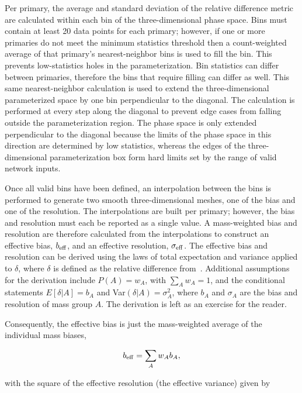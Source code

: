 Per primary, the average and standard deviation of the relative difference metric are calculated within each bin of the three-dimensional phase space.
Bins must contain at least 20 data points for each primary; however, if one or more primaries do not meet the minimum statistics threshold then a count-weighted average of that primary's nearest-neighbor bins is used to fill the bin.
This prevents low-statistics holes in the parameterization.
Bin statistics can differ between primaries, therefore the bins that require filling can differ as well.
This same nearest-neighbor calculation is used to extend the three-dimensional parameterized space by one bin perpendicular to the diagonal.
The calculation is performed at every step along the diagonal to prevent edge cases from falling outside the parameterization region.
The phase space is only extended perpendicular to the diagonal because the limits of the phase space in this direction are determined by low statistics, whereas the edges of the three-dimensional parameterization box form hard limits set by the range of valid network inputs.

Once all valid bins have been defined, an interpolation between the bins is performed to generate two smooth three-dimensional meshes, one of the bias and one of the resolution.
The interpolations are built per primary; however, the bias and resolution must each be reported as a single value.
A mass-weighted bias and resolution are therefore calculated from the interpolations to construct an effective bias, $b_{\rm eff}$, and an effective resolution, $\sigma_{\rm eff}$.
The effective bias and resolution can be derived using the laws of total expectation and variance applied to $\delta$, where $\delta$ is defined as the relative difference from~.
Additional assumptions for the derivation include $P(A)=w_{A}$, with $\sum_{A}w_{A}=1$, and the conditional statements $E\left[\delta|A\right]=b_{A}$ and Var$(\delta|A)=\sigma_{A}^{2}$, where $b_{A}$ and $\sigma_{A}$ are the bias and resolution of mass group $A$. 
The derivation is left as an exercise for the reader.

Consequently, the effective bias is just the mass-weighted average of the individual mass biases,

\begin{equation}
  b_{\rm eff} = \sum_{A} w_{A} b_{A}, \label{eq:effective_bias}
\end{equation}

\noindent
with the square of the effective resolution (the effective variance) given by


